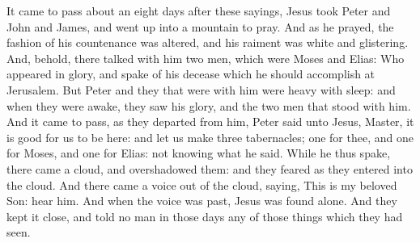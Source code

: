 

 It came to pass about an eight days after these sayings, Jesus took Peter and John and James, and went up into a mountain to pray. And as he prayed, the fashion of his countenance was altered, and his raiment was white and glistering. And, behold, there talked with him two men, which were Moses and Elias: Who appeared in glory, and spake of his decease which he should accomplish at Jerusalem. But Peter and they that were with him were heavy with sleep: and when they were awake, they saw his glory, and the two men that stood with him. And it came to pass, as they departed from him, Peter said unto Jesus, Master, it is good for us to be here: and let us make three tabernacles; one for thee, and one for Moses, and one for Elias: not knowing what he said. While he thus spake, there came a cloud, and overshadowed them: and they feared as they entered into the cloud. And there came a voice out of the cloud, saying, This is my beloved Son: hear him. And when the voice was past, Jesus was found alone. And they kept it close, and told no man in those days any of those things which they had seen.

